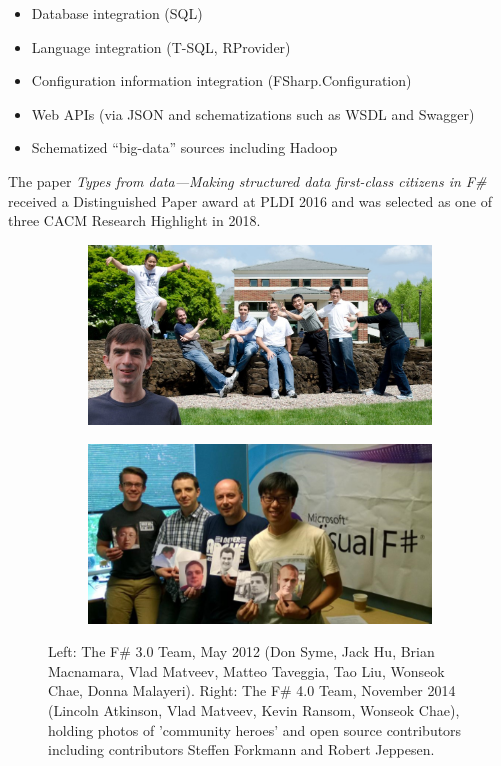 \documentclass[acmsmall]{acmart}\settopmatter{}
\begin{document}
\begin{itemize}
\item Database integration (SQL)
\item Language integration (T-SQL, RProvider)
\item Configuration information integration (FSharp.Configuration)
\item Web APIs (via JSON and schematizations such as WSDL and Swagger)
\item Schematized “big-data” sources including Hadoop
\end{itemize}

The paper \textit{Types from data---Making structured data first-class citizens in F\#} \citep{Petricek2016} received a Distinguished Paper award at PLDI 2016 and was selected as one of three CACM Research Highlight in 2018.

\begin{figure}

  \centering
  \begin{subfigure}[b]{0.48\linewidth}
    \includegraphics[width=\linewidth]{team-2012.jpg}
  \end{subfigure}
  \begin{subfigure}[b]{0.48\linewidth}
    \includegraphics[width=\linewidth]{team-2014.png}
  \end{subfigure}
   \caption{Left: The F\# 3.0 Team, May 2012 (Don Syme, Jack Hu, Brian Macnamara, Vlad Matveev, Matteo Taveggia, Tao Liu, Wonseok Chae, Donna Malayeri).
Right: The F\# 4.0 Team, November 2014  (Lincoln Atkinson, Vlad Matveev, Kevin Ransom, Wonseok Chae), holding photos of 'community heroes' and open source contributors
including contributors Steffen Forkmann and Robert Jeppesen.}
  \label{fig:team-2012-2014}

\end{figure}
\end{document}
